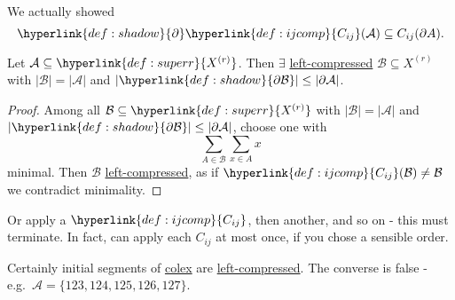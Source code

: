 \documentclass{article}
\let\subset\subseteq
\begin{document}
\begin{remark}
  We actually showed
  \begin{equation*}
    \hyperlink{def:shadow}{\partial} \hyperlink{def:ijcomp}{C_{ij}}(\mathcal{A}) \subset C_{ij}(\partial A). %
  \end{equation*}
\end{remark}
\begin{nprop}\label{prop:1.5}
  Let $\mathcal{A} \subset \hyperlink{def:superr}{X^{(r)}}$.
  Then $\exists$ \hyperlink{def:leftcomp}{left-compressed} $\mathcal{B} \subset X^{(r)}$ with $|\mathcal{B}| = |\mathcal{A}|$ and $|\hyperlink{def:shadow}{\partial \mathcal{B}}| \leq |\partial \mathcal{A}|$.
\end{nprop}
\begin{proof}
  Among all $\mathcal{B} \subset \hyperlink{def:superr}{X^{(r)}}$ with $|\mathcal{B}| = |\mathcal{A}|$ and $|\hyperlink{def:shadow}{\partial \mathcal{B}}| \leq |\partial \mathcal{A}|$,
  choose one with
  \begin{equation*}\sum_{A \in \mathcal{B}} \sum_{x \in A} x\end{equation*}
  minimal.
  Then $\mathcal{B}$ \hyperlink{def:leftcomp}{left-compressed}, as if $\hyperlink{def:ijcomp}{C_{ij}}(\mathcal{B}) \neq \mathcal{B}$ we contradict minimality.
\end{proof}
\begin{remark}
  Or apply a $\hyperlink{def:ijcomp}{C_{ij}}$, then another, and so on - this must terminate.
  In fact, can apply each $C_{ij}$ at most once, if you chose a sensible order.
\end{remark}

Certainly initial segments of \hyperlink{def:colex}{colex} are \hyperlink{def:leftcomp}{left-compressed}.
The converse is false - e.g.\ $\mathcal{A} = \{123,124,125,126,127\}$.
\end{document}
